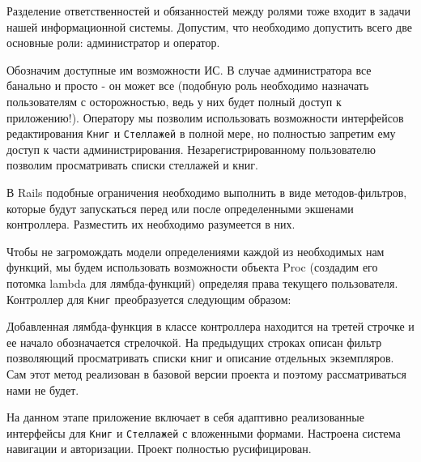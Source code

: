 Разделение ответственностей и обязанностей между ролями тоже
входит в задачи нашей информационной системы. Допустим, что
необходимо допустить всего две основные роли: администратор и оператор.

Обозначим доступные им возможности ИС. В случае администратора все
банально и просто - он может все (подобную роль необходимо назначать
пользователям с осторожностью, ведь у них будет полный доступ к приложению!).
Оператору мы позволим использовать возможности интерфейсов редактирования
\verb|Книг| и \verb|Стеллажей| в полной мере, но полностью запретим
ему доступ к части администрирования. Незарегистрированному пользователю
позволим просматривать списки стеллажей и книг.

В Rails подобные ограничения необходимо выполнить в виде
методов-фильтров, которые будут запускаться перед или после
определенными экшенами
контроллера. Разместить их необходимо разумеется в них.

\newpage

Чтобы не загромождать модели определениями каждой из необходимых нам
функций, мы будем использовать возможности объекта Proc (создадим его потомка
lambda для лямбда-функций) определяя права текущего пользователя. Контроллер
для \verb|Книг| преобразуется следующим образом:

\begin{small}

\end{small}

Добавленная лямбда-функция в классе контроллера находится на третей строчке
и ее начало обозначается стрелочкой. На предыдущих строках
описан фильтр позволяющий просматривать списки книг и описание отдельных
экземпляров. Сам этот метод реализован в базовой версии проекта
и поэтому рассматриваться нами не будет.

На данном этапе приложение включает в себя адаптивно реализованные
интерфейсы для \verb|Книг| и \verb|Стеллажей| с вложенными
формами. Настроена система навигации
и авторизации. Проект полностью русифицирован.
